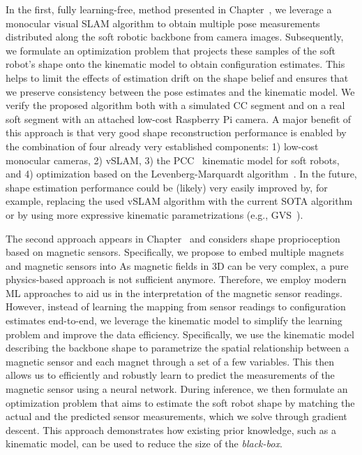 In the first, fully learning-free, method presented in Chapter~\circled{\ref{chp:srslam}}, we leverage a monocular visual \gls{SLAM} algorithm to obtain multiple pose measurements distributed along the soft robotic backbone from camera images. Subsequently, we formulate an optimization problem that projects these samples of the soft robot's shape onto the kinematic model to obtain configuration estimates. This helps to limit the effects of estimation drift on the shape belief and ensures that we preserve consistency between the pose estimates and the kinematic model. 
We verify the proposed algorithm both with a simulated \gls{CC} segment and on a real soft segment with an attached low-cost Raspberry Pi camera.
A major benefit of this approach is that very good shape reconstruction performance is enabled by the combination of four already very established components: 1) low-cost monocular cameras, 2) \gls{vSLAM}, 3) the \gls{PCC}~\cite{webster2010design} kinematic model for soft robots, and 4) optimization based on the Levenberg-Marquardt algorithm~\cite{levenberg1944method, marquardt1963algorithm}.
In the future, shape estimation performance could be (likely) very easily improved by, for example, replacing the used \gls{vSLAM} algorithm with the current \gls{SOTA} algorithm or by using more expressive kinematic parametrizations (e.g., \gls{GVS}~\cite{renda2020geometric}).


The second approach appears in Chapter~\circled{\ref{chp:promasens}} and considers shape proprioception based on magnetic sensors. 
Specifically, we propose to embed multiple magnets and magnetic sensors into 
As magnetic fields in 3D can be very complex, a pure physics-based approach is not sufficient anymore. Therefore, we employ modern \gls{ML} approaches to aid us in the interpretation of the magnetic sensor readings. However, instead of learning the mapping from sensor readings to configuration estimates end-to-end, we leverage the kinematic model to simplify the learning problem and improve the data efficiency. Specifically, we use the kinematic model describing the backbone shape to parametrize the spatial relationship between a magnetic sensor and each magnet through a set of a few variables. 
This then allows us to efficiently and robustly learn to predict the measurements of the magnetic sensor using a neural network. During inference, we then formulate an optimization problem that aims to estimate the soft robot shape by matching the actual and the predicted sensor measurements, which we solve through gradient descent.
This approach demonstrates how existing prior knowledge, such as a kinematic model, can be used to reduce the size of the \emph{black-box}.


